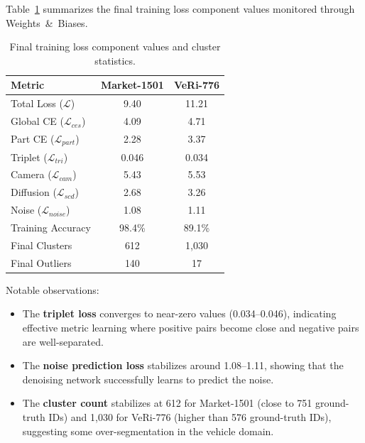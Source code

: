 Table~\ref{tab:loss_components} summarizes the final training loss component values monitored through Weights~\&~Biases.

\begin{table}[H]
    \centering
    \caption{Final training loss component values and cluster statistics.}
    \label{tab:loss_components}
    \begin{tabular}{l c c}
        \toprule
        \textbf{Metric} & \textbf{Market-1501} & \textbf{VeRi-776} \\
        \midrule
        Total Loss ($\mathcal{L}$)         & 9.40   & 11.21  \\
        Global CE ($\mathcal{L}_{ces}$)    & 4.09   & 4.71   \\
        Part CE ($\mathcal{L}_{part}$)     & 2.28   & 3.37   \\
        Triplet ($\mathcal{L}_{tri}$)      & 0.046  & 0.034  \\
        Camera ($\mathcal{L}_{cam}$)       & 5.43   & 5.53   \\
        Diffusion ($\mathcal{L}_{scd}$)    & 2.68   & 3.26   \\
        Noise ($\mathcal{L}_{noise}$)      & 1.08   & 1.11   \\
        \midrule
        Training Accuracy                  & 98.4\% & 89.1\% \\
        Final Clusters                     & 612    & 1,030  \\
        Final Outliers                     & 140    & 17     \\
        \bottomrule
    \end{tabular}
\end{table}

Notable observations:
\begin{itemize}
    \item The \textbf{triplet loss} converges to near-zero values (0.034--0.046), indicating effective metric learning where positive pairs become close and negative pairs are well-separated.
    \item The \textbf{noise prediction loss} stabilizes around 1.08--1.11, showing that the denoising network successfully learns to predict the noise.
    \item The \textbf{cluster count} stabilizes at 612 for Market-1501 (close to 751 ground-truth IDs) and 1,030 for VeRi-776 (higher than 576 ground-truth IDs), suggesting some over-segmentation in the vehicle domain.
\end{itemize}

